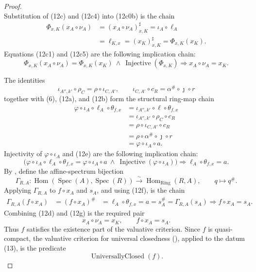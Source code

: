 \begin{proof}
\[  \]
  Substitution of (12c) and (12c4) into (12c0b) is the chain
  \[
  \begin{aligned}
    \Phi_{x,K}(x_A\circ\nu_A)
      &=(x_A\circ\nu_A)_{x,K}^\sharp
       =\iota_A\circ\ell_A\\
      &=\ell_{K,x}
       =(x_K)_{x,K}^\sharp
       =\Phi_{x,K}(x_K).
  \end{aligned}                                                    \tag{12c5}
  \]
  Equations (12c1) and (12c5) are the following implication chain:
  \[
    \Phi_{x,K}(x_A\circ\nu_A)=\Phi_{x,K}(x_K)
      \ \wedge\ \operatorname{Injective}(\Phi_{x,K})
      \Longrightarrow
      x_A\circ\nu_A=x_K.                                       \tag{12d}
  \]

  The identities
  \[
    \iota_{A'',k'}\circ\rho_C
      =\rho\circ\iota_{C,A'},\qquad
    \iota_{C,A'}\circ c_R
      =\alpha^\#\circ\jmath\circ r
  \]
  together with (6), (12a), and (12b) form the structural ring-map chain
  \[
  \begin{aligned}
    \varphi\circ\iota_A\circ\ell_A\circ\theta_{f,x}
      &=\iota_{A'',k'}\circ\ell\circ\theta_{f,x}\\
      &=\iota_{A'',k'}\circ\rho_C\circ c_R\\
      &=\rho\circ\iota_{C,A'}\circ c_R\\
      &=\rho\circ\alpha^\#\circ\jmath\circ r\\
      &=\varphi\circ\iota_A\circ a.
  \end{aligned}                                                  \tag{12e}
  \]
  Injectivity of $\varphi\circ\iota_A$ and (12e) are the following
  implication chain:
  \[
    \bigl(
      \varphi\circ\iota_A\circ\ell_A\circ\theta_{f,x}
        =\varphi\circ\iota_A\circ a
      \ \wedge\
      \operatorname{Injective}(\varphi\circ\iota_A)
    \bigr)
      \Longrightarrow
      \ell_A\circ\theta_{f,x}=a.                              \tag{12f}
  \]
  By , define the affine-spectrum
  bijection
  \[
    \Gamma_{R,A}\colon
      \operatorname{Hom}(\operatorname{Spec}(A),\operatorname{Spec}(R))
      \xrightarrow{\sim}\operatorname{Hom}_{\mathrm{Ring}}(R,A),
    \qquad q\longmapsto q^\#.
  \]
  Applying $\Gamma_{R,A}$ to $f\circ x_A$ and $s_A$, and using (12f), is
  the chain
  \[
  \begin{aligned}
    \Gamma_{R,A}(f\circ x_A)
      &=(f\circ x_A)^\#
      &=\ell_A\circ\theta_{f,x}
       =a=s_A^\#
       =\Gamma_{R,A}(s_A)
      \Longrightarrow f\circ x_A=s_A.
  \end{aligned}                                                  \tag{12g}
  \]
  Combining (12d) and (12g) is the required pair
  \[
    x_A\circ\nu_A=x_K,
    \qquad
    f\circ x_A=s_A.                                              \tag{13}
  \]
  Thus $f$ satisfies the existence part of the valuative criterion.  Since
  $f$ is quasi-compact, the valuative criterion for universal closedness
  (\cite[\href{https://stacks.math.columbia.edu/tag/01KF}{Tag 01KF}]
  {stacks-project}), applied to the datum (13), is the predicate
  \[
    \operatorname{UniversallyClosed}(f).
  \]


\end{proof}
